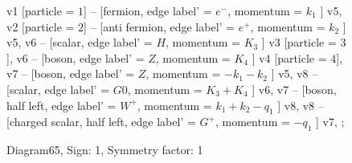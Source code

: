 \documentclass{revtex4}
\begin{document}
\begin{figure}[!htb]
\begin{center}
{    %
v1 [particle = \(1\)] -- [fermion, edge label' = \(e^{-}\), momentum = \(k_{1}\) ] v5, 
v2 [particle = \(2\)] -- [anti fermion, edge label' = \(e^{+}\), momentum = \(k_{2}\) ] v5, 
v6 -- [scalar, edge label' = \(H\), momentum = \(K_{3}\) ] v3 [particle = \(3\)], 
v6 -- [boson, edge label' = \(Z\), momentum = \(K_{4}\) ] v4 [particle = \(4\)], 
v7 -- [boson, edge label' = \(Z\), momentum = \(-k_{1} - k_{2}\) ] v5, 
v8 -- [scalar, edge label' = \(G0\), momentum = \(K_{3} + K_{4}\) ] v6, 
v7 -- [boson, half left, edge label' = \(W^{+}\), momentum = \(k_{1} + k_{2} - q_{1}\) ] v8, 
v8 -- [charged scalar, half left, edge label' = \(G^{+}\), momentum = \(-q_{1}\) ] v7, 
};
\end{center}
\caption{Diagram65, Sign: 1, Symmetry factor: 1}
\end{figure}
\newpage
\end{document}
